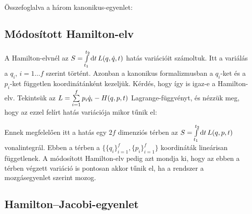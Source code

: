    Összefoglalva a három kanonikus-egyenlet:
   
   \subsection{Módosított Hamilton-elv}
   
   A Hamilton-elvnél az $S=\int\limits_{t_1}^{t_2}\mathrm{d} t\,L(q,\dot{q},t)$ hatás variációit számoltuk. Itt a variálás a $q_i$, $i=1\dots f$ szerint történt. Azonban a kanonikus formalizmusban a $q_i$-ket és a $p_i$-ket független koordinátánként kezeljük. Kérdés, hogy így is igaz-e a Hamilton-elv. Tekintsük az $L=\sum\limits_{i=1}^{f}p_i\dot{q}_i-H(q,p,t)$ Lagrange-függvényt, és nézzük meg, hogy az ezzel felírt hatás variációja mikor tűnik el:
   
   Ennek megfelelően itt a hatás egy $2f$ dimenziós térben az $S=\int\limits_{t_1}^{t_2}\mathrm{d} t\,L(q,p,t)$ vonalintegrál. Ebben a térben a $\big\{\{q_i\}_{i=1}^{f},\{p_i\}_{i=1}^{f}\big\}$ koordináták lineárisan függetlenek. A módosított Hamilton-elv pedig azt mondja ki, hogy az ebben a térben végzett variáció is pontosan akkor tűnik el, ha a rendszer a mozgásegyenlet szerint mozog.
   
  \subsection{Hamilton--Jacobi-egyenlet}
   
